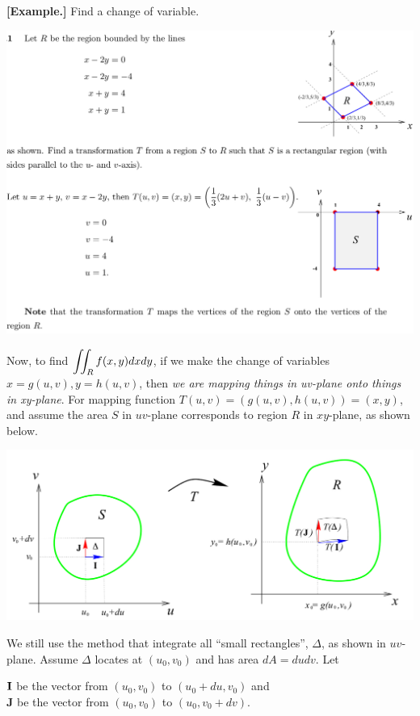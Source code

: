 \documentclass[11pt, a4paper]{MATH2023}
\newcommand{\eg}{\textbf{[Example.] }}
\begin{document}
\begin{spacing}{1.3}
    \newpage
    \eg Find a change of variable.

    \includegraphics[scale=0.25]{images/Ch14-change-var-eg.jpeg}

    Now, to find $\displaystyle \iint_R f(x,y) dxdy$, if we make the change of variables $x=g(u,v), y=h(u,v)$,
    then {\it we are mapping things in uv-plane onto things in xy-plane}. For mapping function 
    $T(u,v)=(g(u,v), h(u,v))=(x,y)$, and assume the area $S$ in $uv$-plane corresponds 
    to region $R$ in $xy$-plane, as shown below.

    \begin{center}
        \includegraphics[scale=0.33]{images/Ch14-jacobian-mapping.jpeg}
    \end{center}

    We still use the method that integrate all ``small rectangles'', $\Delta$, as shown in $uv$-plane.
    Assume $\Delta$ locates at $(u_0,v_0)$ and has area $dA=dudv$. Let

    $\bf I$ be the vector from $\left(u_{0}, v_{0}\right)$ to $\left(u_{0}+d u, v_{0}\right)$ and\\
    $\mathbf{J}$ be the vector from $\left(u_{0}, v_{0}\right)$ to $\left(u_{0}, v_{0}+d v\right)$. 
    

\end{spacing}
\end{document}
